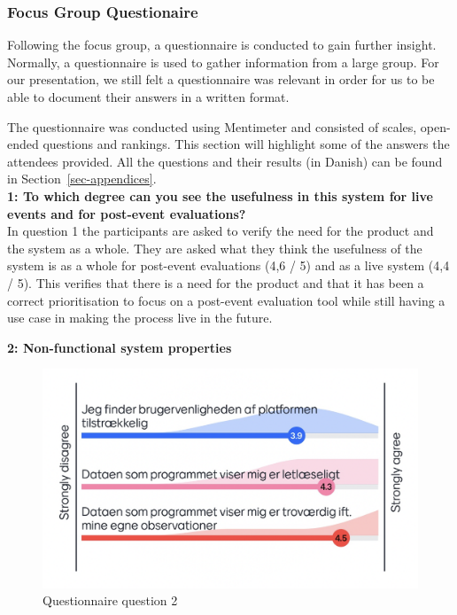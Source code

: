 \documentclass[
]{article}
\begin{document}
\hypertarget{sec-questionnaire}{%
\subsubsection{Focus Group Questionaire}\label{sec-questionnaire}}

Following the focus group, a questionnaire is conducted to gain further
insight. Normally, a questionnaire is used to gather information from a
large group. For our presentation, we still felt a questionnaire was
relevant in order for us to be able to document their answers in a
written format.

The questionnaire was conducted using Mentimeter and consisted of
scales, open-ended questions and rankings. This section will highlight
some of the answers the attendees provided. All the questions and their
results (in Danish) can be found in Section~\ref{sec-appendices}.\\

\textbf{1: To which degree can you see the usefulness in this system for
live events and for post-event evaluations?}\\
In question 1 the participants are asked to verify the need for the
product and the system as a whole. They are asked what they think the
usefulness of the system is as a whole for post-event evaluations (4,6 /
5) and as a live system (4,4 / 5). This verifies that there is a need
for the product and that it has been a correct prioritisation to focus
on a post-event evaluation tool while still having a use case in making
the process live in the future.

\textbf{2: Non-functional system properties}\\

\begin{figure}

{\centering \includegraphics{../images/Evaluation_question2.png}

}

\caption{\label{fig-evaluation_question_2}Questionnaire question 2}

\end{figure}
\end{document}
